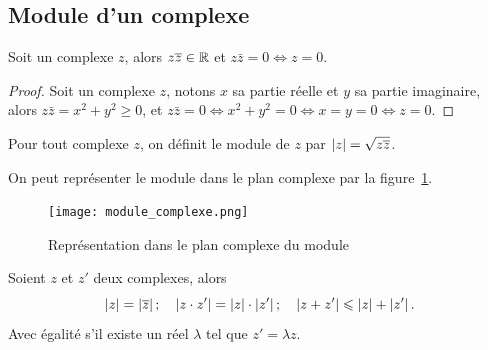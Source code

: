 \subsection{Module d'un complexe}
\label{subsec:modulecomplexe}

\begin{prop}
  Soit un complexe \(z\), alors \(z \overline{z} \in \mathbb{R}\) et \(z \bar{z} = 0 \iff z 
  = 0\).
\end{prop}

\begin{proof}
  Soit un complexe \(z\), notons \(x\) sa partie réelle et \(y\) sa partie 
  imaginaire, alors \(z \bar{z} = x^2 + y^2 \geqslant 0\), et \(z \bar{z} = 0 
  \iff x^2 + y^2 = 0 \iff x = y = 0 \iff z = 0\).
\end{proof}

\begin{defdef}
  Pour tout complexe \(z\), on définit le module de \(z\) par \(\left\lvert z\right\rvert = 
  \sqrt{z \overline{z}}\).
\end{defdef}

On peut représenter le module dans le plan complexe par la 
figure~\ref{fig:moduleComplexe}.

\begin{figure}
  \centering
  \texttt{[image: module\_complexe.png]}
  \caption{Représentation dans le plan complexe du module}
  \label{fig:moduleComplexe}
\end{figure}

\begin{prop}
  Soient \(z\) et \(z'\) deux complexes, alors
  \begin{equation}
    \left\lvert z\right\rvert = \left\lvert\overline{z}\right\rvert; \quad \left\lvert z \cdot z'\right\rvert = \left\lvert z\right\rvert \cdot 
    \left\lvert z'\right\rvert; \quad \left\lvert z + z'\right\rvert\leqslant\left\lvert z\right\rvert + \left\lvert z'\right\rvert.
  \end{equation}
  Avec égalité s'il existe un réel \(\lambda\) tel que \(z' = \lambda z\).
\end{prop}


